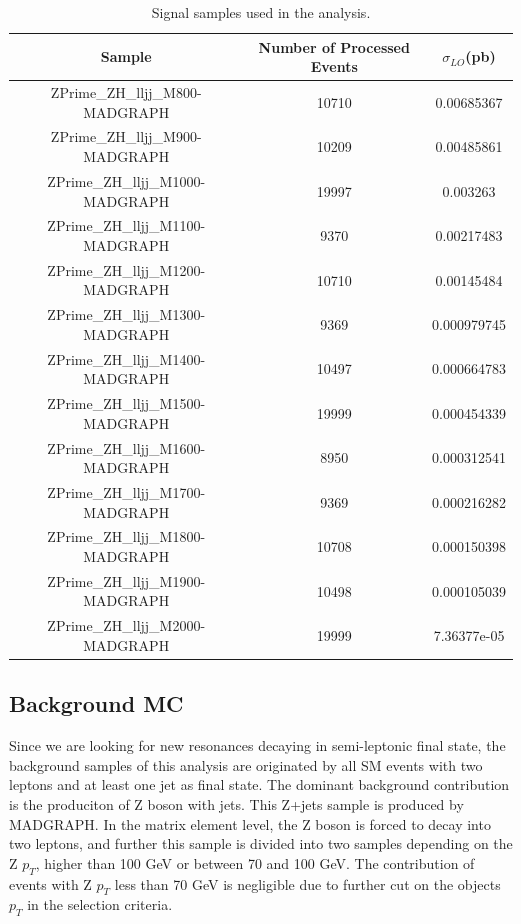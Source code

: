 \begin{center}
  \begin{table}
    \begin{center}
      \begin{tabular}{|c|c|c|}
        \hline
        Sample & Number of Processed Events & $\sigma_{LO}$(pb) \\ \hline
        ZPrime\_ZH\_lljj\_M800-MADGRAPH & 10710 & 0.00685367 \\ \hline
        ZPrime\_ZH\_lljj\_M900-MADGRAPH & 10209 & 0.00485861 \\ \hline
        ZPrime\_ZH\_lljj\_M1000-MADGRAPH & 19997 & 0.003263 \\ \hline
        ZPrime\_ZH\_lljj\_M1100-MADGRAPH & 9370 & 0.00217483 \\ \hline
        ZPrime\_ZH\_lljj\_M1200-MADGRAPH & 10710 & 0.00145484 \\ \hline
        ZPrime\_ZH\_lljj\_M1300-MADGRAPH & 9369 & 0.000979745 \\ \hline
        ZPrime\_ZH\_lljj\_M1400-MADGRAPH & 10497 & 0.000664783 \\ \hline
        ZPrime\_ZH\_lljj\_M1500-MADGRAPH & 19999 & 0.000454339 \\ \hline
        ZPrime\_ZH\_lljj\_M1600-MADGRAPH & 8950 & 0.000312541 \\ \hline
        ZPrime\_ZH\_lljj\_M1700-MADGRAPH & 9369 & 0.000216282 \\ \hline
        ZPrime\_ZH\_lljj\_M1800-MADGRAPH & 10708 & 0.000150398 \\ \hline
        ZPrime\_ZH\_lljj\_M1900-MADGRAPH & 10498 & 0.000105039 \\ \hline
        ZPrime\_ZH\_lljj\_M2000-MADGRAPH & 19999 & 7.36377e-05 \\
        \hline
      \end{tabular}
    \end{center}
    \caption{\label{tab:TableSignalMC}Signal samples used in the analysis.}    
  \end{table}
\end{center}
\newpage
\subsection{Background MC}
Since we are looking for new resonances decaying in semi-leptonic final state, the background samples of this analysis are originated by all SM events with two leptons and at least one jet as final state. The dominant background contribution is the produciton of Z boson with jets. This Z+jets sample is produced by MADGRAPH. In the matrix element level, the Z boson is forced to decay into two leptons, and further this sample is divided into two samples depending on the Z $p_{T}$, higher than 100 GeV or between 70 and 100 GeV. The contribution of events with Z $p_{T}$ less than 70 GeV is negligible due to further cut on the objects $p_{T}$ in the selection criteria.

